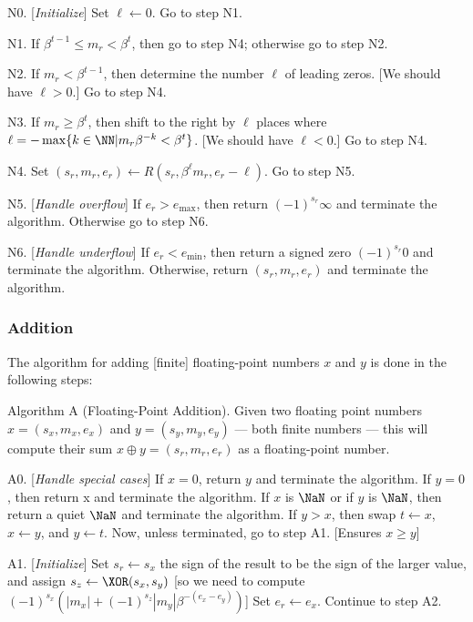 \algstep N0. [{\it Initialize\/}] Set $\ell\gets0$. Go to step N1.

\algstep N1. If $\beta^{t-1}\leq m_{r}<\beta^{t}$, then go to step N4;
otherwise go to step N2.

\algstep N2. If $m_{r} < \beta^{t-1}$, then determine the number $\ell$
of leading zeros. [We should have $\ell>0$.] Go to step N4.

\algstep N3. If $m_{r} \geq \beta^{t}$, then shift to the right by
$\ell$ places where $\ell = -\max\{k\in\NN | m_{r}\beta^{-k}<\beta^{t}\}$.
[We should have $\ell < 0$.]
Go to step N4.

\algstep N4. Set $(s_{r},m_{r},e_{r})\gets R(s_{r},\beta^{\ell}m_{r},e_{r}-\ell)$.
Go to step N5.

\algstep N5. [{\it Handle overflow\/}] If $e_{r}>e_{\text{max}}$, then
return $(-1)^{s_{r}}\infty$ and terminate the algorithm. Otherwise go to
step N6.

\algstep N6. [{\it Handle underflow\/}] If $e_{r}<e_{\text{min}}$, then
return a signed zero $(-1)^{s_{r}}0$ and terminate the
algorithm. Otherwise, return $(s_{r},m_{r},e_{r})$ and terminate the algorithm.\quad\slug

\subsubsection{Addition}

The algorithm for adding [finite] floating-point numbers $x$ and $y$ is
done in the following steps:

\algbegin Algorithm A (Floating-Point Addition). \label{alg:float-addition}Given two floating
point numbers $x=(s_{x},m_{x},e_{x})$ and $y=(s_{y},m_{y},e_{y})$ ---
both finite numbers --- this
will compute their sum $x\oplus y = (s_{r}, m_{r}, e_{r})$ as a
floating-point number.

\algstep A0. [{\it Handle special cases\/}]
If $x = 0$, return $y$ and terminate the algorithm.
If $y=0$, then return x and terminate the algorithm.
If $x$ is $\NaN$ or if $y$ is $\NaN$, then return a quiet $\NaN$
and terminate the algorithm.
If $y > x$, then swap $t\gets x$, $x\gets y$, and $y\gets t$.
Now, unless terminated, go to step A1. [Ensures $x\geq y$]

\algstep A1. [{\it Initialize\/}]
Set $s_{r}\gets s_{x}$ the sign of the
result to be the sign of the larger value, and assign $s_{z} \gets \XOR(s_{x},s_{y})$
[so we need to compute $(-1)^{s_{x}}(|m_{x}| + (-1)^{s_{z}}|m_{y}|\beta^{-(e_{x}-e_{y})})$]
Set $e_{r}\gets e_{x}$. Continue to step A2.

